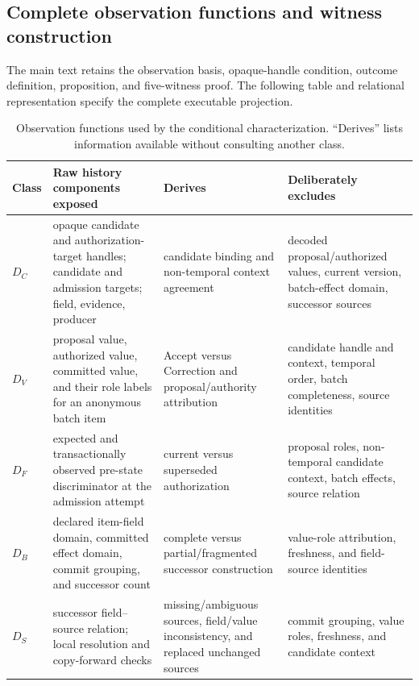 \subsection{Complete observation functions and witness construction}

The main text retains the observation basis, opaque-handle condition, outcome definition, proposition, and five-witness proof. The following table and relational representation specify the complete executable projection.
\begin{table}[t]
\centering
\footnotesize
\caption{Observation functions used by the conditional characterization. ``Derives'' lists information available without consulting another class.}
\label{tab:observation-functions}
\begin{tabularx}{\textwidth}{@{}l>{\raggedright\arraybackslash}p{}>{\raggedright\arraybackslash}p{}>{\raggedright\arraybackslash}X@{}}
\toprule
Class & Raw history components exposed & Derives & Deliberately excludes \\
\midrule
$D_C$ & opaque candidate and authorization-target handles; candidate and admission targets; field, evidence, producer & candidate binding and non-temporal context agreement & decoded proposal/authorized values, current version, batch-effect domain, successor sources \\
$D_V$ & proposal value, authorized value, committed value, and their role labels for an anonymous batch item & Accept versus Correction and proposal/authority attribution & candidate handle and context, temporal order, batch completeness, source identities \\
$D_F$ & expected and transactionally observed pre-state discriminator at the admission attempt & current versus superseded authorization & proposal roles, non-temporal candidate context, batch effects, source relation \\
$D_B$ & declared item-field domain, committed effect domain, commit grouping, and successor count & complete versus partial/fragmented successor construction & value-role attribution, freshness, and field-source identities \\
$D_S$ & successor field--source relation; local resolution and copy-forward checks & missing/ambiguous sources, field/value inconsistency, and replaced unchanged sources & commit grouping, value roles, freshness, and candidate context \\
\bottomrule
\end{tabularx}
\end{table}

